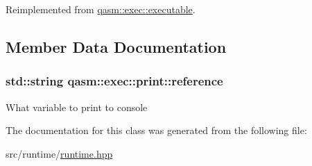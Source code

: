 Reimplemented from \hyperlink{classqasm_1_1exec_1_1executable_ad07f864a889edb0777ebbb1bc1628121}{qasm\+::exec\+::executable}.



\subsection{Member Data Documentation}
\subsubsection[{\texorpdfstring{reference}{reference}}]{\setlength{\rightskip}{0pt plus 5cm}std\+::string qasm\+::exec\+::print\+::reference}\hypertarget{classqasm_1_1exec_1_1print_a8d2e5bc3ca543419f7270f97fea27b9b}{}\label{classqasm_1_1exec_1_1print_a8d2e5bc3ca543419f7270f97fea27b9b}
What variable to print to console 

The documentation for this class was generated from the following file\+:\begin{DoxyCompactItemize}
\item 
src/runtime/\hyperlink{runtime_8hpp}{runtime.\+hpp}\end{DoxyCompactItemize}
